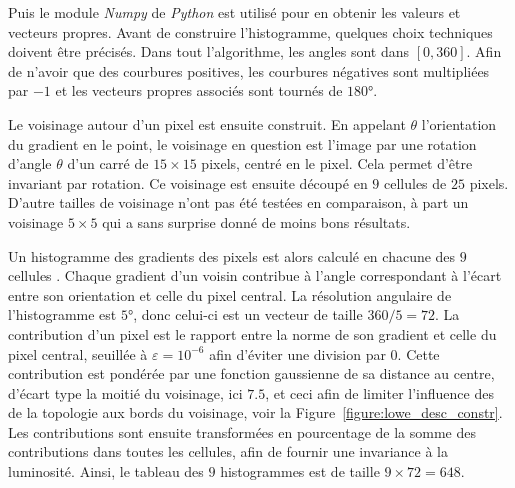 \documentclass[
	a4paper, %
	10pt, %
	unnumberedsections, %
	twoside, %
]{LTJournalArticle}
\begin{document}
Puis le module \textit{Numpy} de \textit{\textit{Python}} est utilisé pour en obtenir les valeurs et vecteurs
propres.
Avant de construire l'histogramme, quelques choix techniques doivent être précisés.
Dans tout l'algorithme, les angles sont dans $[0, 360]$. Afin de n'avoir que des
courbures positives, les courbures négatives sont multipliées par $-1$
et les vecteurs propres associés sont tournés de $180$°.

Le voisinage autour d'un pixel est ensuite construit. En appelant $\theta$
l'orientation du gradient en le point, le voisinage en question est l'image par
une rotation d'angle $\theta$ d'un carré de $15\times 15$ pixels,
centré en le pixel. Cela permet d'être invariant par rotation.
Ce voisinage est ensuite découpé en $9$ cellules de $25$ pixels.
D'autre tailles de voisinage n'ont pas été testées en comparaison, à
part un voisinage $5 \times 5$ qui a sans surprise donné de moins bons résultats.

Un histogramme des gradients des pixels est alors calculé en chacune des $9$ cellules .
Chaque gradient d'un voisin contribue à
l'angle correspondant à l'écart entre son orientation et celle du pixel central.
La résolution angulaire de l'histogramme est $5$°, donc celui-ci est un vecteur de taille
$360 / 5 = 72$.
La contribution d'un pixel
est le rapport entre la norme de son gradient et celle du pixel central,
seuillée à $\varepsilon = 10^{-6}$ afin d'éviter une division par $0$.
Cette contribution est pondérée par une fonction gaussienne de sa distance au centre,
d'écart type la moitié du voisinage, ici $7.5$, et ceci afin de limiter l'influence des
de la topologie aux bords du voisinage, voir la Figure~\ref{figure:lowe_desc_constr}.
Les contributions sont ensuite transformées en pourcentage
de la somme des contributions dans toutes les cellules, afin de fournir une invariance
à la luminosité. Ainsi, le tableau des $9$ histogrammes est de taille $9 \times 72 = 648$.
\end{document}
